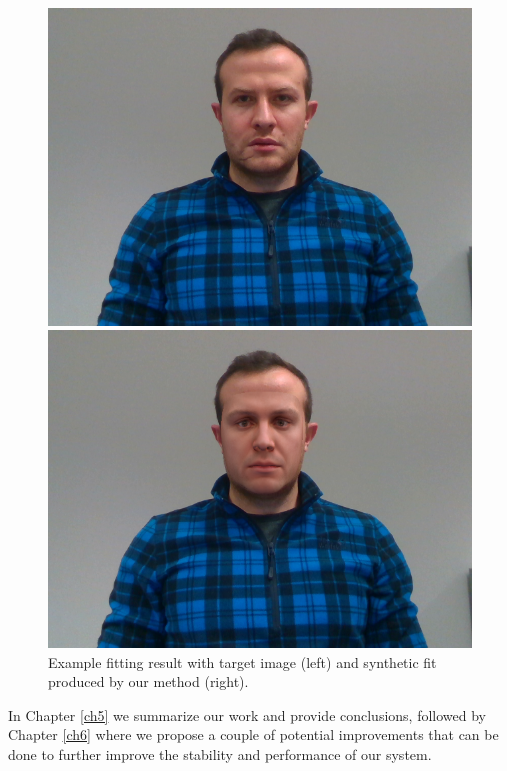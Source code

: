 \begin{figure}
    \centering
    \begin{minipage}{0.49\textwidth}
        \includegraphics[width=0.999\textwidth]{Figures/dataset/target/1.png}
    \end{minipage}
    \begin{minipage}{0.49\textwidth}
        \includegraphics[width=0.999\textwidth]{Figures/dataset/our/1blended.png}
    \end{minipage}
    \caption{Example fitting result with target image (left) and synthetic fit produced by our method (right).}
    \label{f1.3}
\end{figure}

In Chapter \ref{ch5} we summarize our work and provide conclusions, followed by Chapter \ref{ch6} where we propose a couple of potential improvements that can be done to further improve the stability and performance of our system. 

